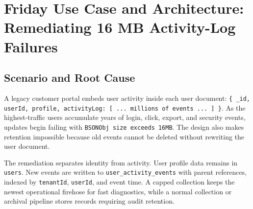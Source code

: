 \section{Friday Use Case and Architecture: Remediating 16 MB Activity-Log Failures}
\subsection{Scenario and Root Cause}
A legacy customer portal embeds user activity inside each user document: \texttt{\{ \_id, userId, profile, activityLog: [ ... millions of events ... ] \}}. As the highest-traffic users accumulate years of login, click, export, and security events, updates begin failing with \texttt{BSONObj size exceeds 16MB}. The design also makes retention impossible because old events cannot be deleted without rewriting the user document.

The remediation separates identity from activity. User profile data remains in \texttt{users}. New events are written to \texttt{user\_activity\_events} with parent references, indexed by \texttt{tenantId}, \texttt{userId}, and event time. A capped collection keeps the newest operational firehose for fast diagnostics, while a normal collection or archival pipeline stores records requiring audit retention.

